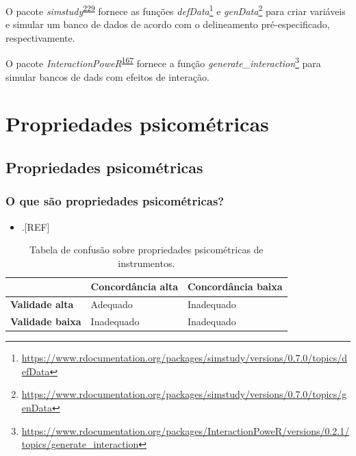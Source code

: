\documentclass[
  a4paper,
]{book}
\providecommand{\tightlist}{%
  \setlength{\itemsep}{0pt}\setlength{\parskip}{0pt}}
\renewcommand{\href}[2]{#2\footnote{\url{#1}}}
\newenvironment{infobox}[1]
  {
  \begin{itemize}
  \renewcommand{\labelitemi}{
    \raisebox{-.7\height}[0pt][0pt]{
      {\setkeys{Gin}{width=3em,keepaspectratio}
        \texttt{[image: \#1]}}
    }
  }
  \setlength{\fboxsep}{1em}
  \begin{blackbox}
  \item
  }
  {
  \end{blackbox}
  \end{itemize}
  }
\begin{document}
\begin{infobox}{images/Rlogo}
O pacote \emph{simstudy}\textsuperscript{\protect\hyperlink{ref-simstudy}{229}} fornece as funções \href{https://www.rdocumentation.org/packages/simstudy/versions/0.7.0/topics/defData}{\emph{defData}} e \href{https://www.rdocumentation.org/packages/simstudy/versions/0.7.0/topics/genData}{\emph{genData}} para criar variáveis e simular um banco de dados de acordo com o delineamento pré-especificado, respectivamente.

\end{infobox}

\begin{infobox}{images/Rlogo}
O pacote \emph{InteractionPoweR}\textsuperscript{\protect\hyperlink{ref-InteractionPoweR}{167}} fornece a função \href{https://www.rdocumentation.org/packages/InteractionPoweR/versions/0.2.1/topics/generate_interaction}{\emph{generate\_interaction}} para simular bancos de dads com efeitos de interação.

\end{infobox}

\hypertarget{propriedades-psicometricas}{%
\chapter{\texorpdfstring{\textbf{Propriedades psicométricas}}{Propriedades psicométricas}}\label{propriedades-psicometricas}}

\hypertarget{propriedades-psicomuxe9tricas}{%
\section{Propriedades psicométricas}\label{propriedades-psicomuxe9tricas}}

\hypertarget{o-que-suxe3o-propriedades-psicomuxe9tricas}{%
\subsection{O que são propriedades psicométricas?}\label{o-que-suxe3o-propriedades-psicomuxe9tricas}}

\begin{itemize}
\tightlist
\item
  .{[}REF{]}
\end{itemize}

\begin{table}

\caption{\label{tab:crosstable-psicometria}Tabela de confusão sobre propriedades psicométricas de instrumentos.}
\centering
\begin{tabu} to 
\toprule
\textbf{ } & \textbf{Concordância alta} & \textbf{Concordância baixa}\\
\midrule
\textbf{Validade alta} & Adequado & Inadequado\\
\textbf{Validade baixa} & Inadequado & Inadequado\\
\bottomrule
\end{tabu}
\end{table}
\end{document}
